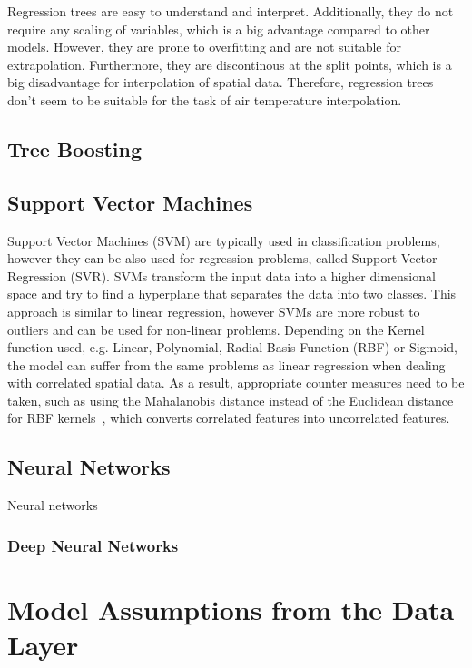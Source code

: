 Regression trees are easy to understand and interpret. Additionally, they do not require any scaling of variables, which is a big advantage compared to other models. However, they are prone to overfitting and are not suitable for extrapolation. Furthermore, they are discontinous at the split points, which is a big disadvantage for interpolation of spatial data. Therefore, regression trees don't seem to be suitable for the task of air temperature interpolation.

\subsection{Tree Boosting}


\subsection{Support Vector Machines}

Support Vector Machines (SVM) are typically used in classification problems, however they can be also used for regression problems, called Support Vector Regression (SVR). SVMs transform the input data into a higher dimensional space and try to find a hyperplane that separates the data into two classes. This approach is similar to linear regression, however SVMs are more robust to outliers and can be used for non-linear problems. Depending on the Kernel function used, e.g. Linear, Polynomial, Radial Basis Function (RBF) or Sigmoid, the model can suffer from the same problems as linear regression when dealing with correlated spatial data.
As a result, appropriate counter measures need to be taken, such as using the Mahalanobis distance instead of the Euclidean distance for RBF kernels~\cite{kamada2006support}, which converts correlated features into uncorrelated features.

\subsection{Neural Networks}

Neural networks 

\subsubsection{Deep Neural Networks}


\section{Model Assumptions from the Data Layer}

